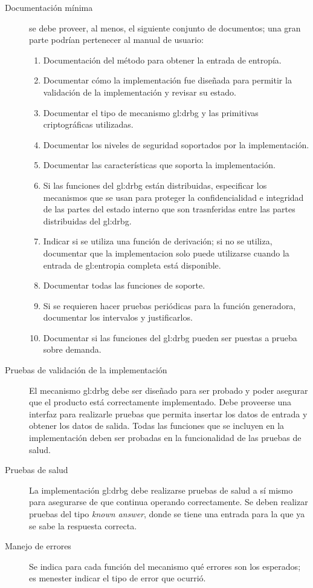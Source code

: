 \begin{description}
  \item[Documentación mínima] se debe proveer, al menos, el siguiente conjunto
    de documentos; una gran parte podrían pertenecer al manual de usuario:
    \begin{enumerate}
      \item Documentación del método para obtener la entrada de entropía.
      \item Documentar cómo la implementación fue diseñada para permitir la
        validación de la implementación y revisar su estado.
      \item Documentar el tipo de mecanismo \gls{gl:drbg} y las primitivas
        criptográficas utilizadas.
      \item Documentar los niveles de seguridad soportados por la
        implementación.
      \item Documentar las características que soporta la implementación.
      \item Si las funciones del \gls{gl:drbg} están distribuidas, especificar
        los mecanismos que se usan para proteger la confidencialidad e
        integridad de las partes del estado interno que son trasnferidas entre
        las partes distribuidas del \gls{gl:drbg}.
      \item Indicar si se utiliza una función de derivación; si no se utiliza,
        documentar que la implementacion solo puede utilizarse cuando la entrada
        de \gls{gl:entropia} completa está disponible.
      \item Documentar todas las funciones de soporte.
      \item Si se requieren hacer pruebas periódicas para la función generadora,
        documentar los intervalos y justificarlos.
      \item Documentar si las funciones del \gls{gl:drbg} pueden ser puestas a
        prueba sobre demanda.
    \end{enumerate}

  \item[Pruebas de validación de la implementación] El mecanismo \gls{gl:drbg}
    debe ser diseñado para ser probado y poder asegurar que el producto está
    correctamente implementado. Debe proveerse una interfaz para realizarle
    pruebas que permita insertar los datos de entrada y obtener los datos de
    salida. Todas las funciones que se incluyen en la implementación deben ser
    probadas en la funcionalidad de las pruebas de salud.

  \item[Pruebas de salud] La implementación \gls{gl:drbg} debe realizarse
    pruebas de salud a sí mismo para asegurarse de que continua operando
    correctamente. Se deben realizar pruebas del tipo \textit{known answer},
    donde se tiene una entrada para la que ya se sabe la respuesta correcta.
  
  \item[Manejo de errores] Se indica para cada función del mecanismo qué errores
    son los esperados; es menester indicar el tipo de error que ocurrió. 

\end{description}